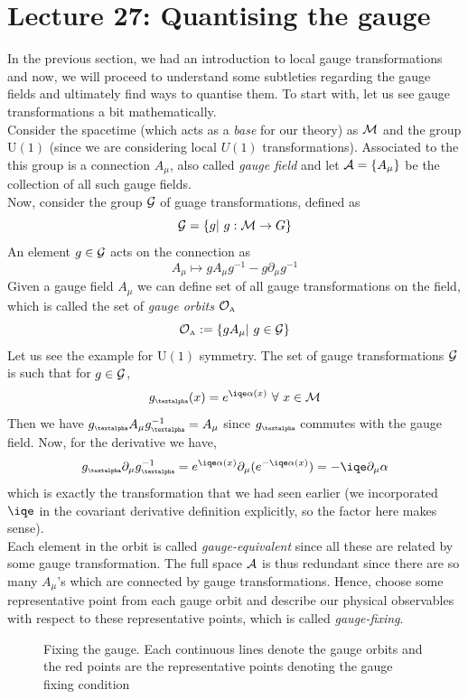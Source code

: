\section*{Lecture 27: Quantising the gauge}
In the previous section, we had an introduction to local gauge transformations and now, we will proceed to understand some subtleties regarding the gauge fields and ultimately find ways to quantise them. To start with, let us see gauge transformations a bit mathematically. \\[0.2cm]
Consider the spacetime (which acts as a \textit{base} for our theory) as $\mathcal M$ and the group $\mathrm{U}(1)$ (since we are considering local $U(1)$ transformations). Associated to the this group is a connection $A_\mu$, also called \textit{gauge field} and let $\mathcal A = \{A_\mu\}$ be the collection of all such gauge fields.\\[0.2cm]
Now, consider the group $\mathcal G$ of guage transformations, defined as
$$\SG = \{g | \ g: \SM\to G\}$$
An element $g\in \mathcal G$ acts on the connection as
$$A_\mu \mapsto gA_\mu g^{-1} -g\partial_\mu g^{-1}$$
Given a gauge field $A_\mu$ we can define set of all gauge transformations on the field, which is called the set of \textit{gauge orbits} $\mathcal O_{\text{\tiny A}}$
$$\mathcal O_{\text{\tiny A}} := \{gA_\mu | \ g \in \mathcal G\}$$
Let us see the example for $\mathrm{U}(1)$ symmetry. The set of gauge transformations $\mathcal G$ is such that for $g\in \mathcal G$,
$$g\tund{\textalpha}(x) = e^{\iqe\alpha(x)}\ \forall \ x\in \SM$$
Then we have $g\tund{\textalpha} A_\mu g^{-1}\tund{\textalpha}  = A_\mu$ since $g\tund{\textalpha}$ commutes with the gauge field. Now, for the derivative we have,
$$g\tund{\textalpha}\partial_\mu g^{-1}\tund{\textalpha} = e^{\iqe\alpha(x)} \partial_\mu (e^{-\iqe\alpha(x)}) = -\iqe\partial_\mu \alpha $$
which is exactly the transformation that we had seen earlier (we incorporated $\iqe$ in the covariant derivative definition explicitly, so the factor here makes sense). \\[0.2cm]
Each element in the orbit is called \textit{gauge-equivalent} since all these are related by some gauge transformation. The full space $\mathcal A$ is thus redundant since there are so many $A_\mu$'s which are connected by gauge transformations. Hence, choose some representative point from each gauge orbit and describe our physical observables with respect to these representative points, which is called \textit{gauge-fixing}.
\begin{figure}[H]
    \centering
    
    \caption{Fixing the gauge. Each continuous lines denote the gauge orbits and the red points are the representative points denoting the gauge fixing condition}
\end{figure}
